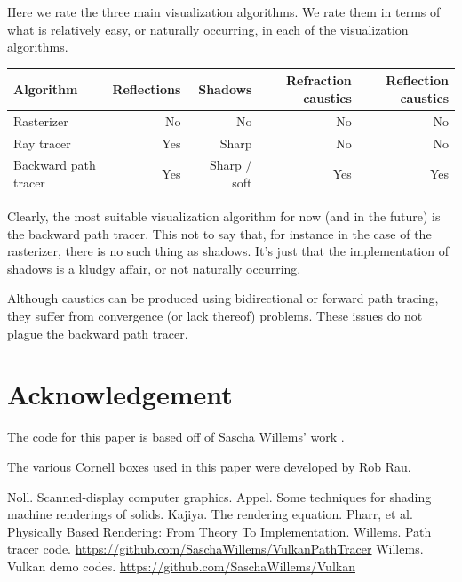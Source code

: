 \documentclass[12pt]{article}
\begin{document}
Here we rate the three main visualization algorithms.
We rate them in terms of what is relatively easy, or naturally occurring, in each of the visualization algorithms.
\begin{center}
\begin{tabular}{| l | r | r | r | r |}
  \hline
 Algorithm &  Reflections & Shadows & Refraction caustics & Reflection caustics \\
\hline
\hline
Rasterizer & No & No & No &  No \\
Ray tracer & Yes & Sharp & No & No  \\
Backward path tracer & Yes & Sharp / soft & Yes & Yes \\
  \hline  
\end{tabular}
\end{center}
Clearly, the most suitable visualization algorithm for now (and in the future) is the backward path tracer.
This not to say that, for instance in the case of the rasterizer, there is no such thing as shadows.
It's just that the implementation of shadows is a kludgy affair, or not naturally occurring.

Although caustics can be produced using bidirectional or forward path tracing, they suffer from convergence (or lack thereof) problems.
These issues do not plague the backward path tracer.



\section{Acknowledgement}

The code for this paper is based off of Sascha Willems' work \cite{willems1, willems2}.

The various Cornell boxes used in this paper were developed by Rob Rau.






\begin{thebibliography}{9}

 Noll. Scanned-display computer graphics.
 Appel. Some techniques for shading machine renderings of solids.
 Kajiya. The rendering equation.
 Pharr, et al. Physically Based Rendering: From Theory To Implementation.
 Willems. Path tracer code. \url{https://github.com/SaschaWillems/VulkanPathTracer}
 Willems. Vulkan demo codes. \url{https://github.com/SaschaWillems/Vulkan}


\end{thebibliography}
\end{document}
